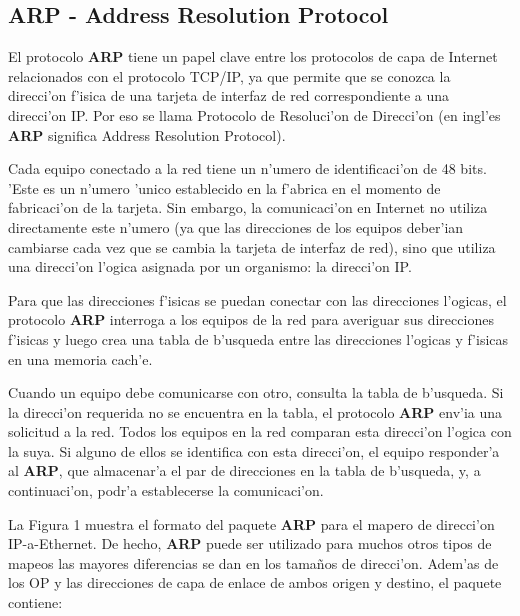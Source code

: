 \documentclass[a4paper,10pt]{article}
\begin{document}
\subsection{ARP - Address Resolution Protocol}

El protocolo \textbf{ARP} tiene un papel clave entre los protocolos de capa de Internet relacionados con el protocolo TCP/IP, ya que permite que se conozca la direcci'on f'isica de una tarjeta de interfaz de red correspondiente a una direcci'on IP. Por eso se llama Protocolo de Resoluci'on de Direcci'on (en ingl'es \textbf{ARP} significa Address Resolution Protocol).

\vspace*{5 mm}
Cada equipo conectado a la red tiene un n'umero de identificaci'on de 48 bits. 'Este es un n'umero 'unico establecido en la f'abrica en el momento de fabricaci'on de la tarjeta. Sin embargo, la comunicaci'on en Internet no utiliza directamente este n'umero (ya que las direcciones de los equipos deber'ian cambiarse cada vez que se cambia la tarjeta de interfaz de red), sino que utiliza una direcci'on l'ogica asignada por un organismo: la direcci'on IP.

\vspace*{5 mm}
Para que las direcciones f'isicas se puedan conectar con las direcciones l'ogicas, el protocolo \textbf{ARP} interroga a los equipos de la red para averiguar sus direcciones f'isicas y luego crea una tabla de b'usqueda entre las direcciones l'ogicas y f'isicas en una memoria cach'e.

\vspace*{5 mm}
Cuando un equipo debe comunicarse con otro, consulta la tabla de b'usqueda. Si la direcci'on requerida no se encuentra en la tabla, el protocolo \textbf{ARP} env'ia una solicitud a la red. Todos los equipos en la red comparan esta direcci'on l'ogica con la suya. Si alguno de ellos se identifica con esta direcci'on, el equipo responder'a al \textbf{ARP}, que almacenar'a el par de direcciones en la tabla de b'usqueda, y, a continuaci'on, podr'a establecerse la comunicaci'on. 

\vspace*{5 mm}
La Figura 1 muestra el formato del paquete \textbf{ARP} para el mapero de direcci'on IP-a-Ethernet. De hecho, \textbf{ARP} puede ser utilizado para muchos otros tipos de mapeos las mayores diferencias se dan en los tama\~nos de direcci'on. Adem'as de los OP y las direcciones de capa de enlace de ambos origen y destino, el paquete contiene:
\end{document}
